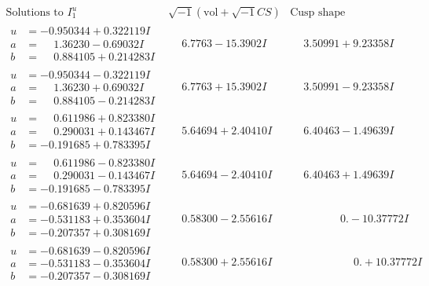 \documentclass[1p]{elsarticle_modified}
\theoremstyle{definition}
\newcommand{\I}{\sqrt{-1}}
\begin{document}
$$\begin{array}{c|c|c}  
\text{Solutions to }I^u_{1}& \I (\text{vol} + \sqrt{-1}CS) & \text{Cusp shape}\\
 \hline 
\begin{aligned}
u &= -0.950344 + 0.322119 I \\
a &= \phantom{-}1.36230 - 0.69032 I \\
b &= \phantom{-}0.884105 + 0.214283 I\end{aligned}
 & \phantom{-}6.7763 - 15.3902 I & \phantom{-}3.50991 + 9.23358 I \\ \hline\begin{aligned}
u &= -0.950344 - 0.322119 I \\
a &= \phantom{-}1.36230 + 0.69032 I \\
b &= \phantom{-}0.884105 - 0.214283 I\end{aligned}
 & \phantom{-}6.7763 + 15.3902 I & \phantom{-}3.50991 - 9.23358 I \\ \hline\begin{aligned}
u &= \phantom{-}0.611986 + 0.823380 I \\
a &= \phantom{-}0.290031 + 0.143467 I \\
b &= -0.191685 + 0.783395 I\end{aligned}
 & \phantom{-}5.64694 + 2.40410 I & \phantom{-}6.40463 - 1.49639 I \\ \hline\begin{aligned}
u &= \phantom{-}0.611986 - 0.823380 I \\
a &= \phantom{-}0.290031 - 0.143467 I \\
b &= -0.191685 - 0.783395 I\end{aligned}
 & \phantom{-}5.64694 - 2.40410 I & \phantom{-}6.40463 + 1.49639 I \\ \hline\begin{aligned}
u &= -0.681639 + 0.820596 I \\
a &= -0.531183 + 0.353604 I \\
b &= -0.207357 + 0.308169 I\end{aligned}
 & \phantom{-}0.58300 - 2.55616 I & \phantom{-0.000000 } 0. - 10.37772 I \\ \hline\begin{aligned}
u &= -0.681639 - 0.820596 I \\
a &= -0.531183 - 0.353604 I \\
b &= -0.207357 - 0.308169 I\end{aligned}
 & \phantom{-}0.58300 + 2.55616 I & \phantom{-0.000000 -}0. + 10.37772 I \\ \hline\begin{aligned}

\end{aligned}
\end{array}$$
\end{document}
